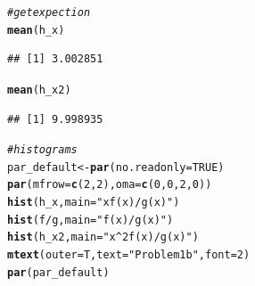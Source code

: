 \documentclass{article}\usepackage[]{graphicx}\usepackage[]{color}
\makeatletter
\newcommand{\hlnum}[1]{\textcolor[rgb]{0.686,0.059,0.569}{#1}}%
\newcommand{\hlstr}[1]{\textcolor[rgb]{0.192,0.494,0.8}{#1}}%
\newcommand{\hlcom}[1]{\textcolor[rgb]{0.678,0.584,0.686}{\textit{#1}}}%
\newcommand{\hlopt}[1]{\textcolor[rgb]{0,0,0}{#1}}%
\newcommand{\hlstd}[1]{\textcolor[rgb]{0.345,0.345,0.345}{#1}}%
\newcommand{\hlkwb}[1]{\textcolor[rgb]{0.69,0.353,0.396}{#1}}%
\newcommand{\hlkwc}[1]{\textcolor[rgb]{0.333,0.667,0.333}{#1}}%
\newcommand{\hlkwd}[1]{\textcolor[rgb]{0.737,0.353,0.396}{\textbf{#1}}}%
\newenvironment{kframe}{%
 \def\at@end@of@kframe{}%
 \ifinner\ifhmode%
  \def\at@end@of@kframe{\end{minipage}}%
  \begin{minipage}{\columnwidth}%
 \fi\fi%
 \def\FrameCommand##1{\hskip\@totalleftmargin \hskip-\fboxsep
 \colorbox{shadecolor}{##1}\hskip-\fboxsep
     \hskip-\linewidth \hskip-\@totalleftmargin \hskip\columnwidth}%
 \MakeFramed {\advance\hsize-\width
   \@totalleftmargin\z@ \linewidth\hsize
   \@setminipage}}%
 {\par\unskip\endMakeFramed%
 \at@end@of@kframe}
\newenvironment{knitrout}{}{} %
\makeatother
\begin{document}
\begin{knitrout}
\begin{kframe}
\begin{alltt}
\hlcom{#get expection}
\hlkwd{mean}\hlstd{(h_x)}
\end{alltt}
\begin{verbatim}
## [1] 3.002851
\end{verbatim}
\begin{alltt}
\hlkwd{mean}\hlstd{(h_x2)}
\end{alltt}
\begin{verbatim}
## [1] 9.998935
\end{verbatim}
\begin{alltt}
\hlcom{#histograms}
\hlstd{par_default} \hlkwb{<-} \hlkwd{par}\hlstd{(}\hlkwc{no.readonly} \hlstd{=} \hlnum{TRUE}\hlstd{)}
\hlkwd{par}\hlstd{(}\hlkwc{mfrow} \hlstd{=} \hlkwd{c}\hlstd{(}\hlnum{2}\hlstd{,} \hlnum{2}\hlstd{),} \hlkwc{oma} \hlstd{=} \hlkwd{c}\hlstd{(}\hlnum{0}\hlstd{,} \hlnum{0}\hlstd{,} \hlnum{2}\hlstd{,} \hlnum{0}\hlstd{))}
\hlkwd{hist}\hlstd{(h_x,} \hlkwc{main} \hlstd{=} \hlstr{"x f(x) / g(x)"}\hlstd{)}
\hlkwd{hist}\hlstd{(f} \hlopt{/} \hlstd{g,} \hlkwc{main} \hlstd{=} \hlstr{"f(x)/g(x)"}\hlstd{)}
\hlkwd{hist}\hlstd{(h_x2,} \hlkwc{main} \hlstd{=} \hlstr{"x^2 f(x) / g(x)"}\hlstd{)}
\hlkwd{mtext}\hlstd{(}\hlkwc{outer} \hlstd{= T,} \hlkwc{text} \hlstd{=} \hlstr{"Problem 1b"}\hlstd{,} \hlkwc{font} \hlstd{=} \hlnum{2}\hlstd{)}
\hlkwd{par}\hlstd{(par_default)}
\end{alltt}
\end{kframe}

\end{knitrout}
\end{document}
